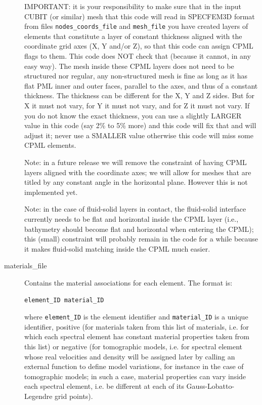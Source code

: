 \begin{description}
IMPORTANT: it is your responsibility to make sure that in the input
CUBIT (or similar) mesh that this code will read in SPECFEM3D format
from files \texttt{nodes\_coords\_file} and \texttt{mesh\_file}
you have created layers of elements that constitute a layer of constant
thickness aligned with the coordinate grid axes (X, Y and/or Z), so
that this code can assign CPML flags to them. This code does NOT check
that (because it cannot, in any easy way). The mesh inside these CPML
layers does not need to be structured nor regular, any non-structured
mesh is fine as long as it has flat PML inner and outer faces, parallel
to the axes, and thus of a constant thickness. The thickness can be
different for the X, Y and Z sides. But for X it must not vary, for
Y it must not vary, and for Z it must not vary. If you do not know
the exact thickness, you can use a slightly LARGER value in this code
(say 2\% to 5\% more) and this code will fix that and will adjust
it; never use a SMALLER value otherwise this code will miss some CPML
elements.


Note: in a future release we will remove the constraint of having
CPML layers aligned with the coordinate axes; we will allow for meshes
that are titled by any constant angle in the horizontal plane. However
this is not implemented yet.


Note: in the case of fluid-solid layers in contact, the fluid-solid
interface currently needs to be flat and horizontal inside the CPML
layer (i.e., bathymetry should become flat and horizontal when entering
the CPML); this (small) constraint will probably remain in the code
for a while because it makes fluid-solid matching inside the CPML
much easier.

\item [{materials\_file}] Contains the material associations for each element.
The format is:
\begin{verbatim}
element_ID material_ID
\end{verbatim}

where \texttt{element\_ID} is the element identifier and \texttt{material\_ID}
is a unique identifier, positive (for materials taken from this list
of materials, i.e. for which each spectral element has constant material
properties taken from this list) or negative (for tomographic models,
i.e. for spectral element whose real velocities and density will be
assigned later by calling an external function to define model variations,
for instance in the case of tomographic models; in such a case, material
properties can vary inside each spectral element, i.e. be different
at each of its Gauss-Lobatto-Legendre grid points).


\end{description}
